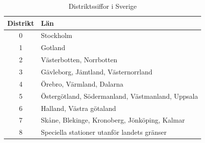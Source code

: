 \begin{table}[h]
	\centering
\begin{tabular}{cl}
	\textbf{Distrikt} & \textbf{Län}                                     \\ \hline %
	      0           & Stockholm                                        \\
	      1           & Gotland                                          \\
	      2           & Västerbotten, Norrbotten                         \\
	      3           & Gävleborg, Jämtland, Västernorrland              \\
	      4           & Örebro, Värmland, Dalarna                        \\
	      5           & Östergötland, Södermanland, Västmanland, Uppsala \\
	      6           & Halland, Västra götaland                         \\
	      7           & Skåne, Blekinge, Kronoberg, Jönköping, Kalmar    \\
	      8           & Speciella stationer utanför landets gränser
\end{tabular}
\caption{Distriktssiffor i Sverige}
\end{table}


